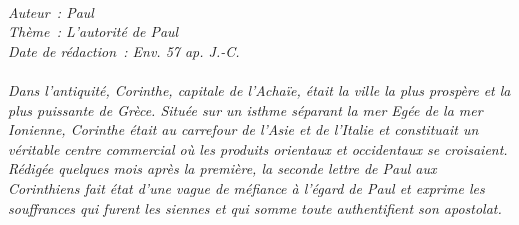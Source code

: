 \BFont
\noindent\hrulefill
{\footnotesize
\textit{
\bigskip
{\centering{}
\\Auteur~: Paul
\\Thème~: L'autorité de Paul
\\Date de rédaction~: Env. 57 ap. J.-C.\\}
}
\textit{
\\Dans l'antiquité, Corinthe, capitale de l'Achaïe, était la ville la plus prospère et la plus puissante de Grèce. Située sur un isthme séparant la mer Egée de la mer Ionienne, Corinthe était au carrefour de l'Asie et de l'Italie et constituait un véritable centre commercial où les produits orientaux et occidentaux se croisaient.
\\Rédigée quelques mois après la première, la seconde lettre de Paul aux Corinthiens fait état d'une vague de méfiance à l'égard de Paul et exprime les souffrances qui furent les siennes et qui somme toute authentifient son apostolat.\bigskip
}
}
\par\nobreak\noindent\hrulefill

